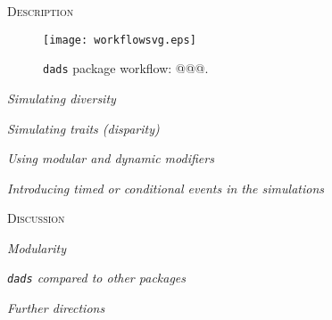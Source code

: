 \documentclass[12pt,letterpaper]{article}
\renewcommand{\section}[1]{%
\bigskip
\begin{center}
\begin{Large}
\normalfont\scshape #1
\medskip
\end{Large}
\end{center}}
\renewcommand{\subsection}[1]{%
\bigskip
\begin{center}
\begin{large}
\normalfont\itshape #1
\end{large}
\end{center}}
\newcommand{\dads}{\texttt{dads} }
\begin{document}




\section{Description}

\begin{figure}[!htbp]
\centering
   \texttt{[image: workflowsvg.eps]} 
\caption{\dads package workflow: @@@.}
\label{Fig:workflow}
\end{figure}

\subsection{Simulating diversity}


\subsection{Simulating traits (disparity)}


\subsection{Using modular and dynamic modifiers}


\subsection{Introducing timed or conditional events in the simulations}


\section{Discussion}

\subsection{Modularity}

\subsection{\dads compared to other packages}

\subsection{Further directions}
\end{document}
